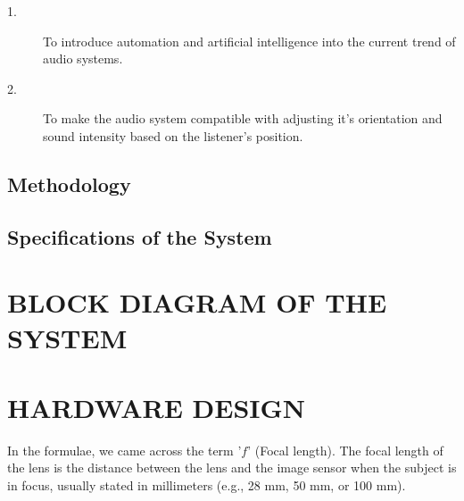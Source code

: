 \documentclass[twocolumn]{report}
\begin{document}
\begin{description}
    
    \item[1.]To introduce automation and artificial intelligence into the current 
    trend of audio systems.
    \item[2.]To make the audio system compatible with adjusting it’s orientation 
    and sound intensity based on the listener’s position.

\end{description}

\section{Methodology}



\section{Specifications of the System}



\chapter{BLOCK DIAGRAM OF THE SYSTEM}



\chapter{HARDWARE DESIGN}



In the formulae, we came across the term '\(f \)' (Focal length).
The focal length of the lens is the distance between the lens and the image sensor 
when the subject is in focus, usually stated in millimeters (e.g., 28 mm, 50 mm, 
or 100 mm).
\end{document}
